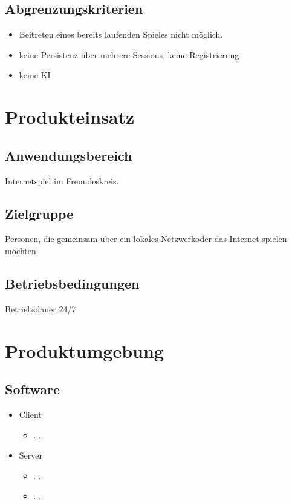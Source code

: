 \documentclass{article}
\begin{document}
\subsection{Abgrenzungskriterien}
\begin{itemize}
	\item Beitreten eines bereits laufenden Spieles nicht möglich.
	\item keine Persistenz über mehrere Sessions, keine Registrierung
	\item keine KI
\end{itemize}

\section{Produkteinsatz}
\subsection{Anwendungsbereich}
Internetspiel im Freundeskreis.
\subsection{Zielgruppe}
Personen, die gemeinsam über ein lokales Netzwerkoder das Internet spielen möchten. 
\subsection{Betriebsbedingungen}
Betriebsdauer 24/7

\section{Produktumgebung}
\subsection{Software}
	\begin{itemize}
		\item \gls{Client}
		\begin{itemize}
			\item ...
		\end{itemize}
		\item \gls{Server}
		\begin{itemize}
			\item ...	
			\item ...
		\end{itemize}
	\end{itemize}
\end{document}
